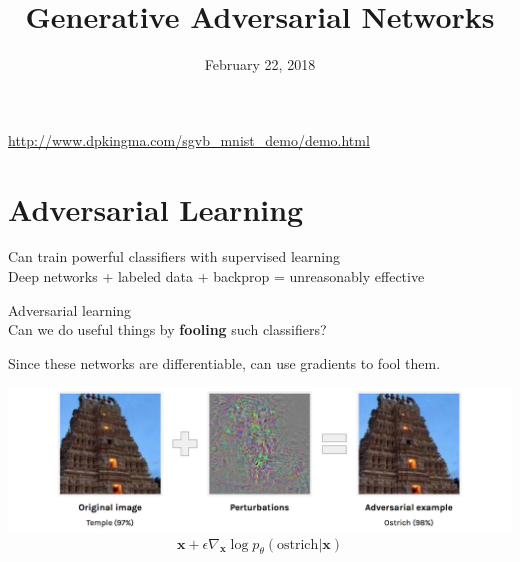 \documentclass{beamer}
\title[latent]{Generative Adversarial Networks}
\author[Yoon Kim]{February 22, 2018}
\institute[Harvard SEAS]{ 
{ }


}
\date{}
\let\tempone\itemize
\let\temptwo\enditemize
\renewenvironment{itemize}{\tempone\addtolength{\itemsep}{0.5\baselineskip}}{\temptwo}
\newcommand{\xvec}{\mathbf{x}}
\begin{document}
\begin{frame}
  \titlepage
\end{frame}

\begin{frame}
  \tableofcontents
\end{frame}


\begin{frame}
\begin{center}
\end{center}
\url{http://www.dpkingma.com/sgvb_mnist_demo/demo.html}
\end{frame}

\section{Adversarial Learning}

\begin{frame}
\begin{center}
\end{center}
\begin{itemize}
\item Can train powerful classifiers with supervised learning \\
Deep networks + labeled data + backprop = unreasonably effective \pause
\item Adversarial learning\\
Can we do useful things by \textbf{fooling} such classifiers? \pause
\item Since these networks are differentiable, can use gradients to fool them.
\end{itemize}
\end{frame}

\begin{frame}
\begin{center}
\end{center}
\center
\includegraphics[scale=0.17]{adv-example}
\[\xvec + \epsilon \nabla_{\xvec} \log p_\theta(\text{ostrich} | \xvec) \]
\end{frame}
\end{document}
